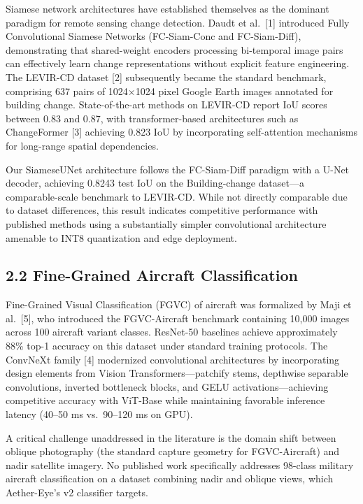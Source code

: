 \documentclass[11pt,a4paper]{article}
\begin{document}
Siamese network architectures have established themselves as the dominant paradigm for remote sensing change detection. Daudt et al.~[1] introduced Fully Convolutional Siamese Networks (FC-Siam-Conc and FC-Siam-Diff), demonstrating that shared-weight encoders processing bi-temporal image pairs can effectively learn change representations without explicit feature engineering. The LEVIR-CD dataset [2] subsequently became the standard benchmark, comprising 637 pairs of 1024×1024 pixel Google Earth images annotated for building change. State-of-the-art methods on LEVIR-CD report IoU scores between 0.83 and 0.87, with transformer-based architectures such as ChangeFormer [3] achieving 0.823 IoU by incorporating self-attention mechanisms for long-range spatial dependencies.

Our SiameseUNet architecture follows the FC-Siam-Diff paradigm with a U-Net decoder, achieving 0.8243 test IoU on the Building-change dataset---a comparable-scale benchmark to LEVIR-CD. While not directly comparable due to dataset differences, this result indicates competitive performance with published methods using a substantially simpler convolutional architecture amenable to INT8 quantization and edge deployment.

\hypertarget{fine-grained-aircraft-classification}{%
\subsection{2.2 Fine-Grained Aircraft Classification}\label{fine-grained-aircraft-classification}}

Fine-Grained Visual Classification (FGVC) of aircraft was formalized by Maji et al.~[5], who introduced the FGVC-Aircraft benchmark containing 10,000 images across 100 aircraft variant classes. ResNet-50 baselines achieve approximately 88\% top-1 accuracy on this dataset under standard training protocols. The ConvNeXt family [4] modernized convolutional architectures by incorporating design elements from Vision Transformers---patchify stems, depthwise separable convolutions, inverted bottleneck blocks, and GELU activations---achieving competitive accuracy with ViT-Base while maintaining favorable inference latency (40--50 ms vs.~90--120 ms on GPU).

A critical challenge unaddressed in the literature is the domain shift between oblique photography (the standard capture geometry for FGVC-Aircraft) and nadir satellite imagery. No published work specifically addresses 98-class military aircraft classification on a dataset combining nadir and oblique views, which Aether-Eye's v2 classifier targets.
\end{document}
